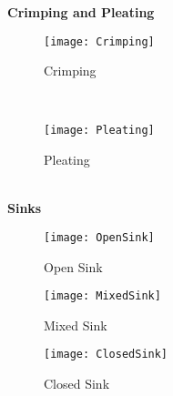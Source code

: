 \textbf{Crimping and Pleating}\\
\begin{figure}[h]
	\centering
	\texttt{[image: Crimping]}
	\caption{Crimping}
	\label{fig:crimping}
\end{figure}\\
\begin{figure}[h]
	\centering
	\texttt{[image: Pleating]}
	\caption{Pleating}
	\label{fig:pleating}
\end{figure}\\
\textbf{Sinks}
\begin{figure}[h]
	\centering
	\texttt{[image: OpenSink]}
	\caption{Open Sink}
	\label{fig:openSink}
\end{figure}
\begin{figure}[h]
	\centering
	\texttt{[image: MixedSink]}
	\caption{Mixed Sink}
	\label{fig:mixedSink}
\end{figure}
\begin{figure}[h]
	\centering
	\texttt{[image: ClosedSink]}
	\caption{Closed Sink}
	\label{fig:closedSink}
\end{figure}










